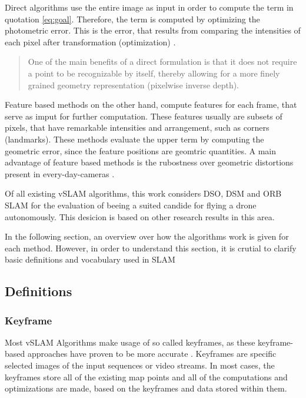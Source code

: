 Direct algorithms use the entire image as input in order to compute the term in quotation \ref{eq:goal}. Therefore, the term is computed by optimizing the photometric error. 
This is the error, that results from comparing the intensities of each pixel after transformation (optimization) \cite{dso}. 

  \begin{quote}
	One of the main benefits of a direct formulation is that it
	does not require a point to be recognizable by itself, thereby
	allowing for a more finely grained geometry representation (pixelwise inverse depth). \cite{dso}
  \end{quote}

Feature based methods on the other hand, compute features for each frame, that serve as imput for further computation. These features usually are subsets of pixels, that have remarkable 
intensities and arrangement, such as corners (landmarks). These methods evaluate the upper term by computing the geometric error, since the feature positions are geomtric 
quantities. A main advantage of feature based methods is the rubostness over geometric distortions present in every-day-cameras \cite{dso}. 

Of all existing vSLAM algorithms, this work considers DSO, DSM and ORB SLAM for the evaluation of beeing a suited candide for flying a drone autonomously. This desicion is based on 
other research results in this area. 



In the following section, an overview over how the algorithms work is given for each method. However, in order to understand this section, it is crutial to clarify basic definitions 
and vocabulary used in SLAM

	\subsection{Definitions}
		
		\subsubsection{Keyframe}
		
		Most vSLAM Algorithms make usage of so called keyframes, as these keyframe-based approaches have proven to be more accurate \cite{keyframe}.
		Keyframes are specific selected images of the input sequences or video streams. In most cases, the keyframes store all of the existing 
		map points and all of the computations and optimizations are made, based on the keyframes and data stored within them. 
	

